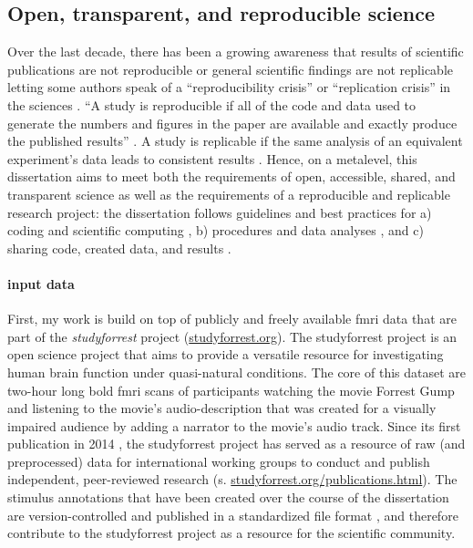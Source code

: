 \subsection{Open, transparent, and reproducible science}

Over the last decade, there has been a growing awareness that results of
scientific publications are not reproducible or general scientific findings are
not replicable letting some authors speak of a ``reproducibility crisis'' or
``replication crisis'' in the sciences \citep{baker2016reproducibility,
plesser2018reproducibility, stupple2019reproducibility, nosek2022replicability}.
``A study is reproducible if all of the code and data used to generate the
numbers and figures in the paper are available and exactly produce the published
results'' \citep{leek2017most}.
A study is replicable if the same analysis of an equivalent experiment's data
leads to consistent results \citep{dubois2016building, leek2017most}.
%
Hence, on a metalevel, this dissertation aims to meet both the requirements of
open, accessible, shared, and transparent science \citep{watson2015will,
fecher2014open} as well as the requirements of a reproducible and replicable
research project:
%
the dissertation follows guidelines and best practices for a) coding and
scientific computing \citep{wilson2014best}, b) procedures and data analyses
\citep{nichols2017best, poldrack2017scanning, poldrack2019establishment}, and c)
sharing code, created data, and results \citep{eglen2017toward, nichols2017best,
pernet2015improving}.


\paragraph{input data}

First, my work is build on top of publicly and freely available \ac{fmri} data
that are part of the \textit{studyforrest} project
(\href{www.studyforrest.org}{\url{studyforrest.org}}).
%
The studyforrest project is an open science project that aims to provide a
versatile resource for investigating human brain function under quasi-natural
conditions.
%
The core of this dataset are two-hour long \ac{bold} \ac{fmri} scans of
participants watching the movie Forrest Gump \citep{ForrestGumpMovie} and
listening to the movie's audio-description that was created for a visually
impaired audience by adding a narrator to the movie's audio track.
%
Since its first publication in 2014 \citep{hanke2014audiomovie}, the
studyforrest project has served as a resource of raw (and preprocessed) data for
international working groups to conduct and publish independent, peer-reviewed
research (s.
\href{www.studyforrest.org/publications.html}{\url{studyforrest.org/publications.html}}).
%
The stimulus annotations that have been created over the course of the
dissertation are version-controlled and published in a standardized file format
\citep{haeusler2021speechanno}, and therefore contribute to the studyforrest
project as a resource for the scientific community.


